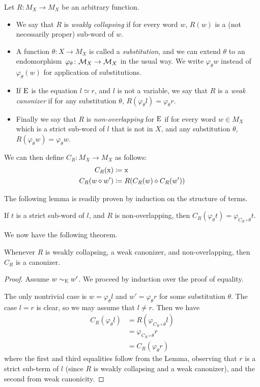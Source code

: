 \begin{definition}\label{def:canon}
Let $R \colon M_X \to M_X$ be an arbitrary function.
\setlength{\parskip}{0pt}
\begin{itemize}
\item  We say that $R$ is \emph{weakly collapsing} if for every word $w$, $R(w)$ is a (not necessarily proper) sub-word of $w$.
\item  A function $\theta\colon X\rightarrow M_X$ is called a \emph{substitution}, and we can extend $\theta$ to an endomorphism~$\varphi_\theta \colon {\mathcal{M}}_X\rightarrow{\mathcal{M}}_X$ in the usual way. We write $\varphi_\theta w$ instead of $\varphi_\theta(w)$ for application of substitutions.
\item  If $\mathrm{E}$ is the equation $l\simeq r$, and $l$ is not a variable, we say that $R$ is a \emph{weak canonizer} if for any substitution $\theta$, $R(\varphi_\theta l)=\varphi_\theta r$.
\item  Finally we say that $R$ is \emph{non-overlapping} for $\mathrm{E}$ if for every word $w\in M_X$ which is a strict sub-word of $l$ that is not in $X$, and any substitution $\theta$, $R(\varphi_\theta w) = \varphi_\theta w$.
\end{itemize}
  We can then define $C_R\colon M_X\rightarrow M_X$ as follows:
\begin{align}
  C_R(\mathrm{x}) &\coloneqq \mathrm{x}\\
  C_R(w\diamond w') &\coloneqq R(C_R(w)\diamond C_R(w'))
\end{align}
\end{definition}

The following lemma is readily proven by induction on the structure of terms.

\begin{lemma}\label{lem:subsubst}
  If $t$ is a strict sub-word of $l$, and $R$ is non-overlapping, then $C_R(\varphi_\theta t) = \varphi_{C_R\circ \theta} t$.
\end{lemma}
We now have the following theorem.
\begin{theorem}\label{thm:canon}
  Whenever $R$ is weakly collapsing, a weak canonizer, and non-overlapping, then $C_R$ is a canonizer.
\end{theorem}
\begin{proof}
  Assume $w\sim_{\mathrm{E}}w'$. We proceed by induction over the proof of equality.

  The only nontrivial case is $w = \varphi_\theta l$ and $w'=\varphi_\theta r$ for some substitution $\theta$.  The case $l=r$ is clear, so we may assume that $l \neq r$.
  Then we have
  \begin{align*}
    C_R(\varphi_\theta l) &= R(\varphi_{C_R\circ\theta}l) \\
                 &= \varphi_{C_R\circ\theta}r\\
                 &= C_R(\varphi_\theta r)
  \end{align*}
  where the first and third equalities follow from the Lemma, observing that $r$ is a strict sub-term of $l$ (since $R$ is weakly collapsing and a weak canonizer), and the second from weak canonicity.
\end{proof}

